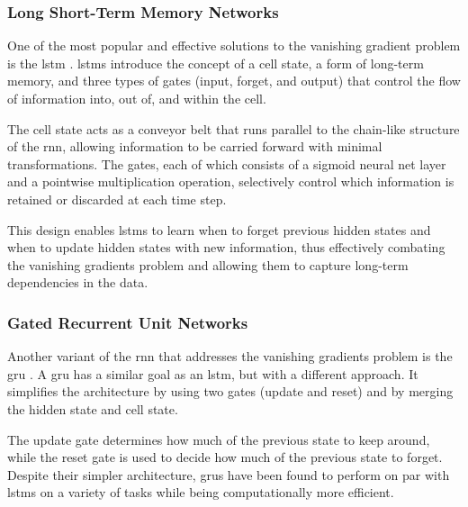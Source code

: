 \subsubsection{Long Short-Term Memory Networks}

One of the most popular and effective solutions to the vanishing gradient
problem is the \gls{lstm} \citep{lstm:1997}. \gls{lstm}s introduce the concept
of a cell state, a form of long-term memory, and three types of gates (input,
forget, and output) that control the flow of information into, out of, and
within the cell.

The cell state acts as a conveyor belt that runs parallel to the chain-like
structure of the \gls{rnn}, allowing information to be carried forward with
minimal transformations. The gates, each of which consists of a sigmoid neural
net layer and a pointwise multiplication operation, selectively control which
information is retained or discarded at each time step.

This design enables \glspl{lstm} to learn when to forget previous hidden states
and when to update hidden states with new information, thus effectively
combating the vanishing gradients problem and allowing them to capture
long-term dependencies in the data.

\subsubsection{Gated Recurrent Unit Networks}

Another variant of the \gls{rnn} that addresses the vanishing gradients problem
is the \gls{gru} \citep{gru:2014}. A \gls{gru} has a similar goal as an
\gls{lstm}, but with a different approach. It simplifies the architecture by
using two gates (update and reset) and by merging the hidden state and cell
state.

The update gate determines how much of the previous state to keep around, while
the reset gate is used to decide how much of the previous state to forget.
Despite their simpler architecture, \glspl{gru} have been found to perform on
par with \glspl{lstm} on a variety of tasks while being computationally more
efficient.

